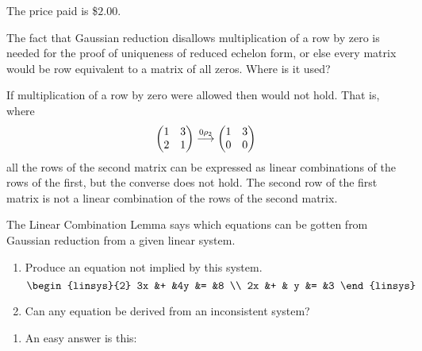 \begin{exercises}
\begin{answer}
\begin{equation*}
     \end{equation*}
     The price paid is \$$2.00$.
   \end{answer}
  \item
   The fact that Gaussian reduction disallows multiplication of
   a row by zero is needed for the proof of uniqueness of reduced echelon form,
   or else every matrix would
   be row equivalent to a matrix of all zeros.
   Where is it used?
   \begin{answer}
     If multiplication of a row by zero were allowed then
     would not hold.
     That is, where
     \begin{equation*}
       \begin{pmatrix}
         1  &3  \\
         2  &1
       \end{pmatrix}
       \mathrel{ \mathop{\longrightarrow}\limits^{0\rho_2\mathstrut}_{ \begin{subarray}{l} \relax \end{subarray}}}
       \begin{pmatrix}
         1  &3  \\
         0  &0
       \end{pmatrix}
     \end{equation*}
     all the rows of the second matrix can be expressed as linear combinations
     of the rows of the first, but the converse does not hold.
     The second row of the first matrix is not a linear combination of the
     rows of the second matrix.  
   \end{answer}
  \recommended \item 
   The Linear Combination Lemma says which equations can be gotten from
   Gaussian reduction from a given linear system.
   \begin{enumerate}
     \item Produce an equation not implied by this system.
       \begin{equation*}
         \begin{linsys}{2}
           3x  &+  &4y  &=  &8 \\
           2x  &+  & y  &=  &3 
         \end{linsys}
       \end{equation*}
     \item Can any equation be derived from an inconsistent system?
   \end{enumerate}
   \begin{answer}
     \begin{enumerate}
        \item An easy answer is this:
          \begin{equation*}

\end{equation*}
\end{enumerate}
\end{answer}
\end{exercises}
